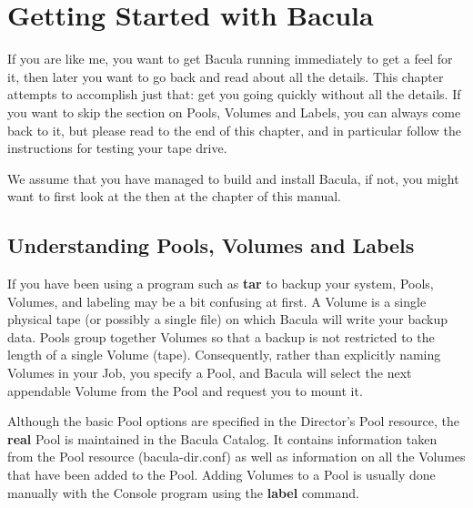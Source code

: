 
\section*{Getting Started with Bacula}
\label{_ChapterStart37}

If you are like me, you want to get Bacula running immediately to get a feel
for it, then later you want to go back and read about all the details. This
chapter attempts to accomplish just that: get you going quickly without all
the details. If you want to skip the section on Pools, Volumes and Labels, you
can always come back to it, but please read to the end of this chapter, and in
particular follow the instructions for testing your tape drive. 

We assume that you have managed to build and install Bacula, if not, you might
want to first look at the 
 then at the 
 chapter of
this manual. 
\label{PoolsVolsLabels}

\subsection*{Understanding Pools, Volumes and Labels}

If you have been using a program such as {\bf tar} to backup your system,
Pools, Volumes, and labeling may be a bit confusing at first. A Volume is a
single physical tape (or possibly a single file) on which Bacula will write
your backup data. Pools group together Volumes so that a backup is not
restricted to the length of a single Volume (tape). Consequently, rather than
explicitly naming Volumes in your Job, you specify a Pool, and Bacula will
select the next appendable Volume from the Pool and request you to mount it. 

Although the basic Pool options are specified in the Director's Pool resource,
the {\bf real} Pool is maintained in the Bacula Catalog. It contains
information taken from the Pool resource (bacula-dir.conf) as well as
information on all the Volumes that have been added to the Pool. Adding
Volumes to a Pool is usually done manually with the Console program using the
{\bf label} command. 


